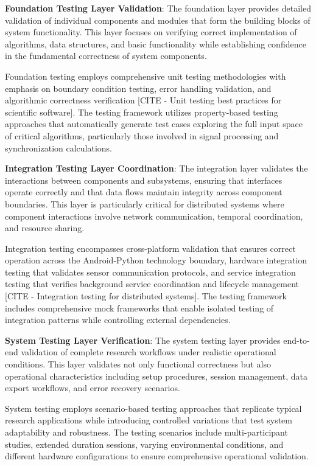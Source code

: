 \documentclass[11pt,a4paper]{report}
\begin{document}
\textbf{Foundation Testing Layer Validation}: The foundation layer provides detailed validation of individual components and
modules that form the building blocks of system functionality. This layer focuses on verifying correct implementation of
algorithms, data structures, and basic functionality while establishing confidence in the fundamental correctness of
system components.

Foundation testing employs comprehensive unit testing methodologies with emphasis on boundary condition testing, error
handling validation, and algorithmic correctness
verification [CITE - Unit testing best practices for scientific software]. The testing framework utilizes property-based
testing approaches that automatically generate test cases exploring the full input space of critical algorithms,
particularly those involved in signal processing and synchronization calculations.

\textbf{Integration Testing Layer Coordination}: The integration layer validates the interactions between components and
subsystems, ensuring that interfaces operate correctly and that data flows maintain integrity across component
boundaries. This layer is particularly critical for distributed systems where component interactions involve network
communication, temporal coordination, and resource sharing.

Integration testing encompasses cross-platform validation that ensures correct operation across the Android-Python
technology boundary, hardware integration testing that validates sensor communication protocols, and service integration
testing that verifies background service coordination and lifecycle
management [CITE - Integration testing for distributed systems]. The testing framework includes comprehensive mock
frameworks that enable isolated testing of integration patterns while controlling external dependencies.

\textbf{System Testing Layer Verification}: The system testing layer provides end-to-end validation of complete research
workflows under realistic operational conditions. This layer validates not only functional correctness but also
operational characteristics including setup procedures, session management, data export workflows, and error recovery
scenarios.

System testing employs scenario-based testing approaches that replicate typical research applications while introducing
controlled variations that test system adaptability and robustness. The testing scenarios include multi-participant
studies, extended duration sessions, varying environmental conditions, and different hardware configurations to ensure
comprehensive operational validation.
\end{document}
